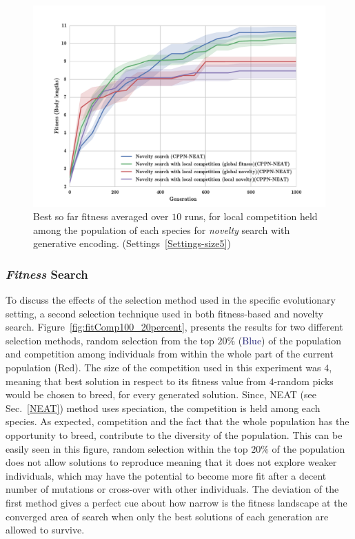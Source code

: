 \begin{figure}[t!]
\centering
\includegraphics[width=1.0\textwidth]{../Figures/Results/NoveltyCompetitionsSize5.pdf}
\caption{Best so far fitness averaged over $10$ runs, for local competition held among the population of each species for \emph{novelty} search with generative encoding. (Settings~\ref{Settings-size5})}
\label{fig:NoveltyCompetitionsSize5}
\end{figure}


\subsubsection*{\emph{Fitness} Search}

To discuss the effects of the selection method used in the specific evolutionary setting, a second selection technique used in both fitness-based and novelty search. Figure~\ref{fig:fitComp100_20percent}, presents the results for two different selection methods, random selection from the top $20\%$ (\textcolor{MidnightBlue}{Blue}) of the population and competition among individuals from within the whole part of the current population (\textcolor{BrickRed}{Red}). The size of the competition used in this experiment was $4$, meaning that best solution in respect to its fitness value from $4$-random picks would be chosen to breed, for every generated solution. Since, NEAT (see Sec.~\ref{NEAT}) method uses speciation, the competition is held among each species. As expected, competition and the fact that the whole population has the opportunity to breed, contribute to the diversity of the population. This can be easily seen in this figure, random selection within the top $20\%$ of the population does not allow solutions to reproduce meaning that it does not explore weaker individuals, which may have the potential to become more fit after a decent number of mutations or cross-over with other individuals. The deviation of the first method gives a perfect cue about how narrow is the fitness landscape at the converged area of search when only the best solutions of each generation are allowed to survive.

